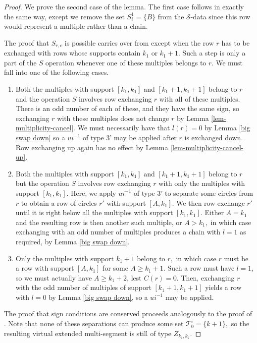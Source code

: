 \documentclass[11pt,letterpaper]{amsart}
\numberwithin{equation}{section}
\begin{document}
\begin{proof}
    We prove the second case of the lemma. The first case follows in exactly the same way, except we remove the set $S_i^1 = \{B\}$ from the $\mathcal{S}$-data since this row would represent a multiple rather than a chain. 
    
    The proof that $S_{r, c}$ is possible carries over from \cite[Lemma 5.28]{HKT26} except when the row $r$ has to be exchanged with rows whose supports contain $k_1$ or $k_1 + 1$. Such a step is only a part of the $S$ operation whenever one of these multiples belongs to $r.$ We must fall into one of the following cases.
     \begin{enumerate}
         \item Both the multiples with support $[k_1, k_1]$ and $[k_1 + 1, k_1 + 1]$ belong to $r$ and the operation $S$ involves row exchanging $r$ with all of these multiples. There is an odd number of each of these, and they have the same sign, so exchanging $r$ with these multiples does not change $r$ by Lemma \ref{lem-multiplicity-cancel}. We must necessarily have that $l(r) = 0$ by Lemma \ref{big swap down} so a $ui^{-1}$ of type 3' may be applied after $r$ is exchanged down. Row exchanging up again has no effect by Lemma \ref{lem-multiplicity-cancel-up}. 
         \item Both the multiples with support $[k_1, k_1]$ and $[k_1 + 1, k_1 + 1]$ belong to $r$ but the operation $S$ involves row exchanging $r$ with only the multiples with support $[k_1, k_1].$ Here, we apply $ui^{-1}$ of type 3' to separate some circles from $r$ to obtain a row of circles $r'$ with support $[A, k_1].$ We then row exchange $r'$ until it is right below all the multiples with support $[k_1, k_1].$ Either $A = k_1$ and the resulting row is then another such multiple, or $A > k_1,$ in which case exchanging with an odd number of multiples produces a chain with $l = 1$ as required, by Lemma \ref{big swap down}.
         \item Only the multiples with support $k_1 + 1$ belong to $r,$ in which case $r$ must be a row with support $[A, k_1]$ for some $A \geq k_1 + 1.$ Such a row must have $l = 1$, so we must actually have $A \geq k_1 + 2$, lest $C(r) = 0$. Then, exchanging $r$ with the odd number of multiples of support $[k_1 + 1, k_1 + 1]$ yields a row with $l = 0$ by Lemma \ref{big swap down}, so a $ui^{-1}$ may be applied. 
     \end{enumerate}

     The proof that sign conditions are conserved proceeds analogously to the proof of \cite[Lemma 5.28]{HKT26}. Note that none of these separations can produce some set $\mathcal{T}_0^i = \{k + 1\},$ so the resulting virtual extended multi-segment is still of type $Z_{k_1, k_2}.$
\end{proof}
\end{document}
